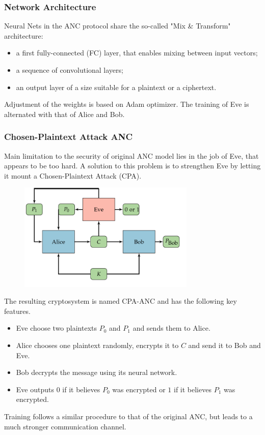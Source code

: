 \documentclass{beamer}
\begin{document}
\begin{frame}
\frametitle{Network Architecture}
Neural Nets in the ANC protocol share the so-called "Mix \& Transform" architecture:
\begin{itemize}
\item a first fully-connected (FC) layer, that enables mixing between input vectors;
\item a sequence of convolutional layers;
\item an output layer of a size suitable for a plaintext or a ciphertext.
\end{itemize}
Adjustment of the weights is based on Adam optimizer. The training of Eve is alternated with that of Alice and Bob.
\end{frame}
\begin{frame}
\frametitle{Chosen-Plaintext Attack ANC}
Main limitation to the security of original ANC model lies in the job of Eve, that appears to be too hard. A solution to this problem is to strengthen Eve by letting it mount a Chosen-Plaintext Attack (CPA).
\begin{figure}
\includegraphics[width = 0.75\textwidth]{"pictures/cpa-anc.png"}
\end{figure}
\end{frame}
\begin{frame}
The resulting cryptosystem is named CPA-ANC and has the following key features.
\begin{itemize}
\item Eve choose two plaintexts $P_0$ and $P_1$ and sends them to Alice. 
\item Alice chooses one plaintext randomly, encrypts it to $C$ and send it to Bob and Eve.
\item Bob decrypts the message using its neural network.
\item Eve outputs $0$ if it believes $P_0$ was encrypted or $1$ if it believes $P_1$ was encrypted.
\end{itemize}
Training follows a similar procedure to that of the original ANC, but leads to a much stronger communication channel.
\end{frame}
\end{document}
